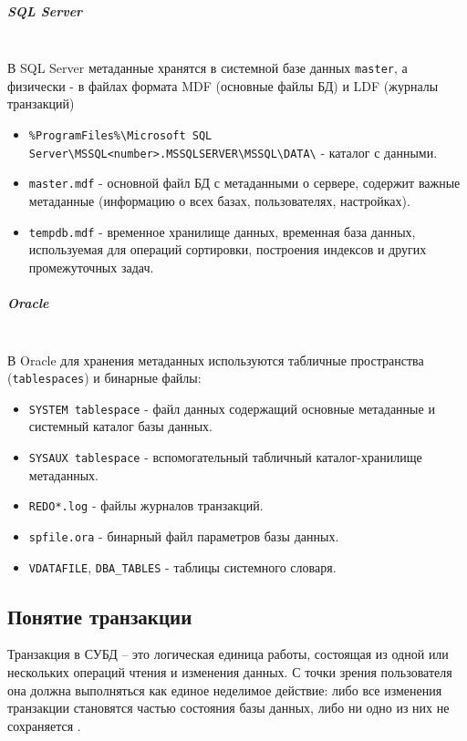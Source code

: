 \subparagraph{SQL Server} \autocite{MicrosoftLearnSQLserverMasterdb,MicrosoftLearnSQLserverTempdb,MicrosoftLearnSQLserverDBfiles,MicrosoftLearnSQLserverFileLoc} ~\\

В SQL Server метаданные хранятся в системной базе данных \texttt{master}, а физически - в файлах формата MDF (основные файлы БД) и LDF (журналы транзакций)

\begin{itemize}
    \item \texttt{\%ProgramFiles\%\textbackslash{}Microsoft SQL Server\textbackslash{}MSSQL<number>.MSSQLSERVER\textbackslash{}MSSQL\textbackslash{}DATA\textbackslash{}} - каталог с данными.
    \item \texttt{master.mdf} - основной файл БД с метаданными о сервере, содержит важные метаданные (информацию о всех базах, пользователях, настройках).
    \item \texttt{tempdb.mdf} - временное хранилище данных, временная база данных, используемая для операций сортировки, построения индексов и других промежуточных задач.
\end{itemize}


\subparagraph{Oracle} \autocites[§1.338]{oracledbdoc0}{oracledbdoc4}{OracleRedoLog} ~\\

В Oracle для хранения метаданных используются табличные пространства (\texttt{tablespaces}) и бинарные файлы:

\begin{itemize}
    \item \texttt{SYSTEM tablespace} - файл данных содержащий основные метаданные и системный каталог базы данных.
    \item \texttt{SYSAUX tablespace} - вспомогательный табличный каталог-хранилище метаданных.
    \item \texttt{REDO*.log} - файлы журналов транзакций.
    \item \texttt{spfile.ora} - бинарный файл параметров базы данных.
    \item \texttt{V\textdollar DATAFILE}, \texttt{DBA\_TABLES} - таблицы системного словаря.
\end{itemize}

\subsection{Понятие транзакции}

Транзакция в СУБД -- это логическая единица работы, состоящая из одной или нескольких операций чтения и изменения данных. С точки зрения пользователя она должна выполняться как единое неделимое действие: либо все изменения транзакции становятся частью состояния базы данных, либо ни одно из них не сохраняется \autocites{ElmasriNavathe}{Silberschatz}.

